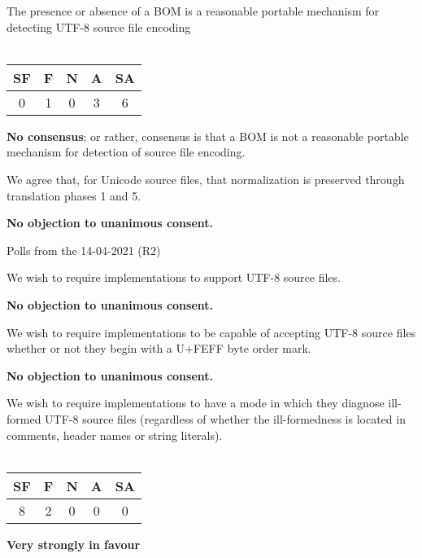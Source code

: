 \documentclass{wg21}
\begin{document}
\begin{quoteblock}
The presence or absence of a BOM is a reasonable portable mechanism
for detecting UTF-8 source file encoding
\\\\
\begin{tabular}{|c|c|c|c|c|}
\hline
SF & F & N & A & SA \\
\hline
0 & 1 & 0 & 3 & 6 \\
\hline
\end{tabular}

\textbf{No consensus};  or rather,
consensus is that a BOM is not a reasonable portable mechanism for detection of source file encoding.    
\end{quoteblock}

\begin{quoteblock}
We agree that, for Unicode source files, that normalization is preserved through translation phases 1 and 5.

\textbf{No objection to unanimous consent.}    
\end{quoteblock}

Polls from the 14-04-2021 (R2)

\begin{quoteblock}
We wish to require implementations to support UTF-8 source files.

\textbf{No objection to unanimous consent.}
\end{quoteblock}


\begin{quoteblock}
We wish to require implementations to be capable of accepting UTF-8
source files whether or not they begin with a U+FEFF byte order mark.

\textbf{No objection to unanimous consent.}
\end{quoteblock}

\begin{quoteblock}
We wish to require implementations to have a mode in which they diagnose
ill-formed UTF-8 source files (regardless of whether the ill-formedness is
located in comments, header names or string literals).
\\\\
\begin{tabular}{|c|c|c|c|c|}
    \hline
    SF & F & N & A & SA \\
    \hline
    8 & 2 & 0 & 0 & 0 \\
    \hline
\end{tabular}

\textbf{Very strongly in favour} 
\end{quoteblock}
\end{document}

